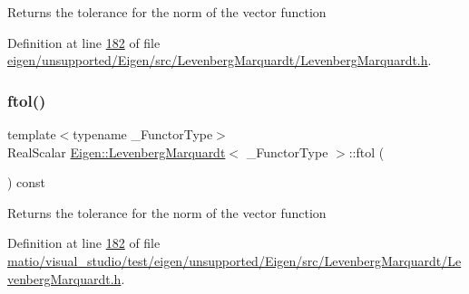 \begin{DoxyReturn}{Returns}
the tolerance for the norm of the vector function 
\end{DoxyReturn}


Definition at line \hyperlink{eigen_2unsupported_2_eigen_2src_2_levenberg_marquardt_2_levenberg_marquardt_8h_source_l00182}{182} of file \hyperlink{eigen_2unsupported_2_eigen_2src_2_levenberg_marquardt_2_levenberg_marquardt_8h_source}{eigen/unsupported/\+Eigen/src/\+Levenberg\+Marquardt/\+Levenberg\+Marquardt.\+h}.

\mbox{\label{class_eigen_1_1_levenberg_marquardt_a957ac071ec775779bb03d10b463ddfbc}} 
\subsubsection{\texorpdfstring{ftol()}{ftol()}\hspace{0.1cm}{\footnotesize\ttfamily [2/2]}}
{\footnotesize\ttfamily template$<$typename \+\_\+\+Functor\+Type$>$ \\
Real\+Scalar \hyperlink{class_eigen_1_1_levenberg_marquardt}{Eigen\+::\+Levenberg\+Marquardt}$<$ \+\_\+\+Functor\+Type $>$\+::ftol (\begin{DoxyParamCaption}{ }\end{DoxyParamCaption}) const\hspace{0.3cm}{\ttfamily [inline]}}

\begin{DoxyReturn}{Returns}
the tolerance for the norm of the vector function 
\end{DoxyReturn}


Definition at line \hyperlink{matio_2visual__studio_2test_2eigen_2unsupported_2_eigen_2src_2_levenberg_marquardt_2_levenberg_marquardt_8h_source_l00182}{182} of file \hyperlink{matio_2visual__studio_2test_2eigen_2unsupported_2_eigen_2src_2_levenberg_marquardt_2_levenberg_marquardt_8h_source}{matio/visual\+\_\+studio/test/eigen/unsupported/\+Eigen/src/\+Levenberg\+Marquardt/\+Levenberg\+Marquardt.\+h}.

\mbox{\label{class_eigen_1_1_levenberg_marquardt_a6c296a4a5b91f0ecc398b479a67c242d}} 
